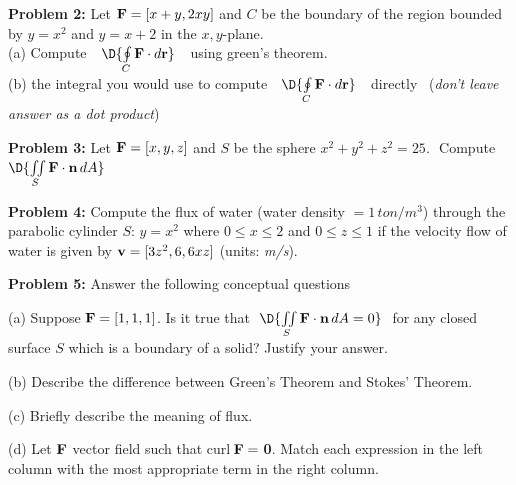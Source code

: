 \documentclass[12pt]{amsart}
\numberwithin{equation}{section}
\begin{document}
{\bf Problem 2:} Let $\text{\bf F} = [x+y,2xy]$ and $C$ be the boundary of the region bounded by $y=x^2$ and $y=x+2$ in the $x,y$-plane. \\
(a) Compute \,\, $\D{\oint \limits_{C} \text{\bf F}\cdot d\text{\bf r}}$ \,\, using green's theorem.\\
(b)  the integral you would use to compute \,\, $\D{\oint \limits_{C} \text{\bf F}\cdot d\text{\bf r}}$ \,\, directly \,\,\,({\em don't leave answer as a dot product})

\thispagestyle{empty}
\newpage
\thispagestyle{empty}

{\bf Problem 3:} Let $\text{\bf F} = [x,y,z]$ and $S$ be the sphere $x^2+y^2+z^2 = 25$.  \,\,Compute \,$\D{\iint \limits_{S} \text{\bf F}\cdot \text{\bf n} \, dA}$

\vspace{0.2cm}

\thispagestyle{empty}
\newpage
\thispagestyle{empty}

{\bf Problem 4:} Compute the flux of water (water density $= 1 \, ton/m^3$) through the parabolic cylinder $S:\, y=x^2$ where $0 \le x \le 2$ and $0 \le z \le 1$ if the velocity flow of water is given by $\text{\bf v} = [3z^2, 6, 6xz]$ (units: {\em m/s}).

\thispagestyle{empty}
\newpage
\thispagestyle{empty}

{\bf Problem 5:} Answer the following conceptual questions

\vspace{0.1cm}

(a) \quad Suppose $\text{{\bf F}} = [1,1,1]$.  Is it true that \,\,$\D{\iint \limits_{S} \text{\bf F}\cdot \text{\bf n} \, dA = 0}$ \,\,for any closed surface $S$ which is a boundary of a solid?  Justify your answer.

\vspace{4.0cm}

(b) \quad Describe the difference between Green's Theorem and Stokes' Theorem.

\vspace{4.0cm}

(c) \quad Briefly describe the meaning of flux.

\vspace{4.0cm}

(d) Let $\text{\bf F}$ vector field such that curl\,$\text{\bf F} =$ {\bf 0}.  Match each expression in the left column with the most appropriate term in the right column.
\end{document}
